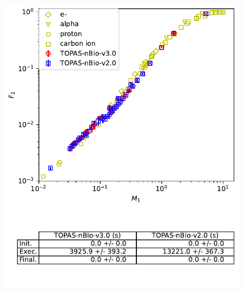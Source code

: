 \documentclass[aspectratio=1610]{beamer}
\begin{document}
\begin{frame}{\secname}
  \begin{columns}
    \begin{column}{0.4\linewidth}
     \includegraphics[width=\textwidth]{./NanodosimetryII/nanoII_opt4}
    \end{column}
    \begin{column}{0.4\linewidth} 

\end{column}
\end{columns}
\end{frame}
\end{document}
